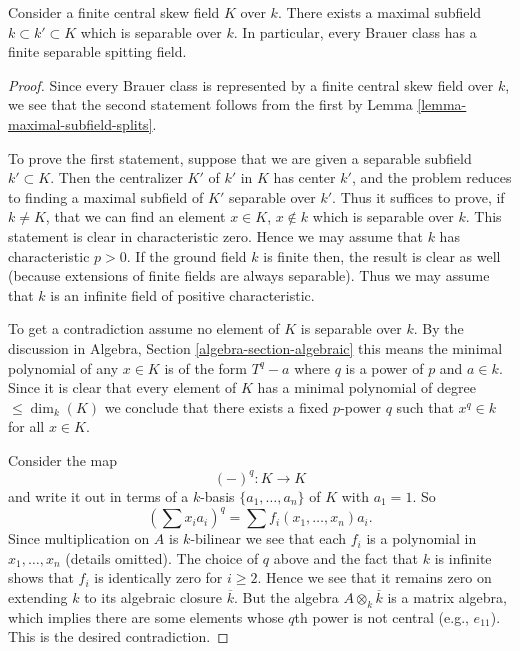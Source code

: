 \begin{proposition}
\label{proposition-separable-splitting-field}
Consider a finite central skew field $K$ over $k$.
There exists a maximal subfield $k \subset k' \subset K$ which
is separable over $k$.
In particular, every Brauer class has a finite separable
spitting field.
\end{proposition}

\begin{proof}
Since every Brauer class is represented by a finite central skew
field over $k$, we see that the second statement follows from the
first by
Lemma \ref{lemma-maximal-subfield-splits}.

\medskip\noindent
To prove the first statement, suppose that we are given a separable
subfield $k' \subset K$. Then the centralizer $K'$ of $k'$ in $K$
has center $k'$, and the problem reduces to finding a maximal
subfield of $K'$ separable over $k'$. Thus it suffices to prove, if
$k \not = K$, that we can find an element $x \in K$, $x \not \in k$
which is separable over $k$. This statement is clear in characteristic
zero. Hence we may assume that $k$ has characteristic $p > 0$. If the
ground field $k$ is finite then, the result is clear as well (because
extensions of finite fields are always separable). Thus we may assume
that $k$ is an infinite field of positive characteristic.

\medskip\noindent
To get a contradiction assume no element of $K$ is separable over $k$.
By the discussion in
Algebra, Section \ref{algebra-section-algebraic}
this means the minimal polynomial of any $x \in K$ is of the form
$T^q - a$ where $q$ is a power of $p$ and $a \in k$. Since it is
clear that every element of $K$ has a minimal polynomial of degree
$\leq \dim_k(K)$ we conclude that there exists a fixed $p$-power
$q$ such that $x^q \in k$ for all $x \in K$.

\medskip\noindent
Consider the map
$$
(-)^q : K \longrightarrow K
$$
and write it out in terms of a $k$-basis $\{a_1, \ldots, a_n\}$ of $K$
with $a_1 = 1$. So
$$
(\sum x_i a_i)^q = \sum f_i(x_1, \ldots, x_n)a_i.
$$
Since multiplication on $A$ is $k$-bilinear we see that each $f_i$
is a polynomial in $x_1, \ldots, x_n$ (details omitted).
The choice of $q$ above and the fact that $k$ is infinite shows that
$f_i$ is identically zero for $i \geq 2$. Hence we see that it remains
zero on extending $k$ to its algebraic closure $\overline{k}$. But the
algebra $A \otimes_k \overline{k}$ is a matrix algebra, which implies
there are some elements whose $q$th power is not central (e.g., $e_{11}$).
This is the desired contradiction.
\end{proof}

